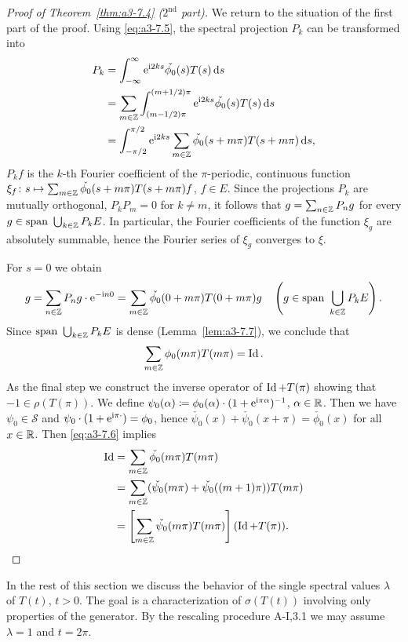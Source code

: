 \begin{proof}[Proof of Theorem~\ref{thm:a3-7.4} ($ 2^{\text{nd}} $ part)]
We return to the situation of the first part of the proof.
Using \eqref{eq:a3-7.5}, the spectral projection $P_{k}$ can be transformed into
\begin{align*}
P_{k} &= \int_{-\infty}^{\infty} \mathrm{e}^{\mathrm{i} 2ks}\check{\phi_{0}}(s)T(s)\mathop{}\!\mathrm{d}{s} \\
&= \sum_{m\in\mathbb{Z}} \int_{(m-1/2)\pi}^{(m+1/2)\pi} \mathrm{e}^{\mathrm{i} 2ks}\check{\phi_{0}}(s)T(s)\mathop{}\!\mathrm{d}{s} \\
&= \int_{-\pi/2}^{\pi/2} \mathrm{e}^{\mathrm{i} 2ks}\sum_{m\in\mathbb{Z}}\check{\phi_{0}}(s+m\pi)T(s+m\pi)\mathop{}\!\mathrm{d}{s} ,
\end{align*}
\ie $P_{k}f$ is the $k$-th Fourier coefficient of the $\pi$-periodic, continuous function $\xi_{f} \colon s \mapsto \sum_{m\in\mathbb{Z}} \check{\phi_{0}}(s+m\pi)T(s+m\pi)f$, $f \in E$.
Since the projections $P_{k}$ are mutually orthogonal, \ie $P_{k}P_{m} = 0$ for $k \neq m$, it follows that $g = \sum_{n\in\mathbb{Z}} P_{n}g$ for every $g \in \text{span }\bigcup_{k\in\mathbb{Z}} P_{k}E$.
In particular, the Fourier coefficients of the function $\xi_{g}$ are absolutely summable, hence the Fourier series of $\xi_{g}$ converges to $\xi$.

For $s = 0$ we obtain
\[
g = \sum_{n\in\mathbb{Z}} P_{n}g\cdot \mathrm{e}^{-\mathrm{i} n0} = \sum_{m\in\mathbb{Z}} \check{\phi_{0}}(0 + m\pi)T(0 + m\pi)g \quad 
\left(g \in \text{span }\bigcup_{k\in\mathbb{Z}} P_{k}E\right) .
\]
Since $\text{span }\bigcup_{k\in\mathbb{Z}} P_{k}E$ is dense (Lemma~\ref{lem:a3-7.7}), we conclude that
\begin{equation}\label{eq:a3-7.6}
\sum_{m\in\mathbb{Z}} \phi_{0}(m\pi)T(m\pi) = \operatorname{Id} .
\end{equation}
As the final step we construct the inverse operator of $\operatorname{Id} + T(\pi)$ showing that $-1 \in \rho(T(\pi))$.
We define $\psi_{0}(\alpha) \coloneqq \phi_{0}(\alpha)\cdot(1 + \mathrm{e}^{\mathrm{i}\pi\alpha})^{-1}$, $\alpha \in \mathbb{R}$.
Then we have $\psi_{0} \in \mathcal{S}$ and $\psi_{0}\cdot(1 + \mathrm{e}^{\mathrm{i}\pi\cdot}) = \phi_{0}$,
hence $\check{\psi_{0}}(x) + \check{\psi_{0}}(x + \pi) = \check{\phi_{0}}(x)$ for all $x \in \mathbb{R}$.
Then \eqref{eq:a3-7.6} implies
\begin{align*}
\operatorname{Id} &= \sum_{m\in\mathbb{Z}} \check{\phi_{0}}(m\pi)T(m\pi) \\
&= \sum_{m\in\mathbb{Z}} (\check{\psi_{0}}(m\pi) + \check{\psi_{0}}((m+1)\pi))T(m\pi) \\
&= \left[ \sum_{m\in\mathbb{Z}} \check{\psi_{0}}(m\pi)T(m\pi) \right] (\operatorname{Id} + T(\pi)) .
\end{align*}
\phantom{x}
\end{proof}
In the rest of this section we discuss the behavior of the single spectral values $\lambda$ of $T(t)$, $t > 0$.
The goal is a characterization of $\sigma(T(t))$ involving only properties of the generator.
By the rescaling procedure A-I,3.1 we may assume $\lambda = 1$ and $t = 2\pi$.

